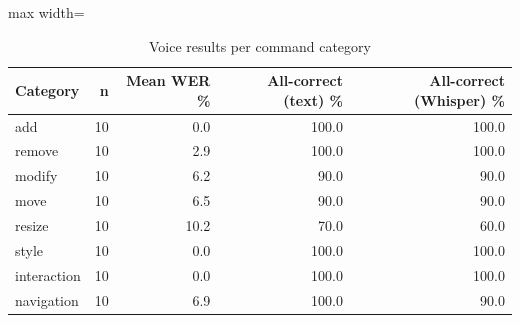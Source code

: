 \begin{table}[t]
\centering
\scriptsize
\caption{Voice results per command category}
\label{tab:voicecat}
\setlength{\tabcolsep}{3.5pt}
\begin{adjustbox}{max width=\columnwidth}
\begin{tabular}{lrrrr}
\toprule
\textbf{Category} & \textbf{n} & \textbf{Mean WER \%} & \textbf{All-correct (text) \%} & \textbf{All-correct (Whisper) \%} \\
\midrule
add & 10 & 0.0 & 100.0 & 100.0 \\
remove & 10 & 2.9 & 100.0 & 100.0 \\
modify & 10 & 6.2 & 90.0 & 90.0 \\
move & 10 & 6.5 & 90.0 & 90.0 \\
resize & 10 & 10.2 & 70.0 & 60.0 \\
style & 10 & 0.0 & 100.0 & 100.0 \\
interaction & 10 & 0.0 & 100.0 & 100.0 \\
navigation & 10 & 6.9 & 100.0 & 90.0 \\
\bottomrule
\end{tabular}
\end{adjustbox}
\end{table}
